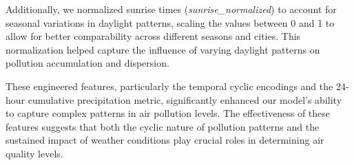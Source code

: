 \documentclass[twoside,11pt]{article}
\begin{document}
Additionally, we normalized sunrise times (\textit{sunrise\_normalized}) to account for seasonal variations in daylight patterns, scaling the values between 0 and 1 to allow for better comparability across different seasons and cities. This normalization helped capture the influence of varying daylight patterns on pollution accumulation and dispersion.

These engineered features, particularly the temporal cyclic encodings and the 24-hour cumulative precipitation metric, significantly enhanced our model's ability to capture complex patterns in air pollution levels. The effectiveness of these features suggests that both the cyclic nature of pollution patterns and the sustained impact of weather conditions play crucial roles in determining air quality levels.


\newpage











\end{document}
